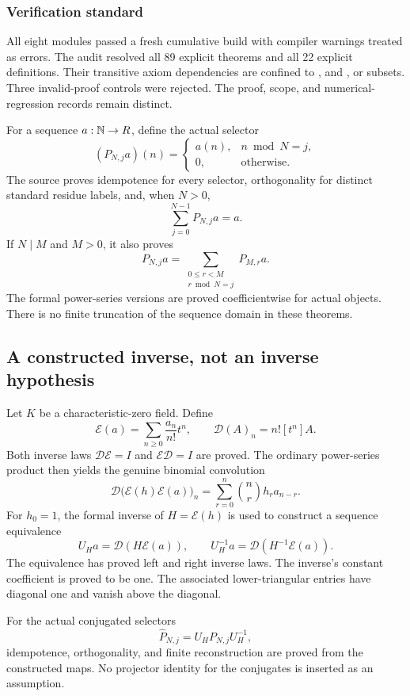 \subsubsection*{Verification standard}
All eight modules passed a fresh cumulative build with compiler warnings treated as errors. The audit resolved all 89 explicit theorems and all 22 explicit definitions. Their transitive axiom dependencies are confined to ,  and , or subsets. Three invalid-proof controls were rejected. The proof, scope, and numerical-regression records remain distinct.
\par\medskip
{}
For a sequence $a:\mathbb N\to R$, define the actual selector
\[
 (P_{N,j}a)(n)=\begin{cases}a(n),&n\bmod N=j,\\0,&\text{otherwise.}\end{cases}
\]
The source proves idempotence for every selector, orthogonality for distinct standard residue labels, and, when $N>0$,
\[
 \sum_{j=0}^{N-1}P_{N,j}a=a.
\]
If $N\mid M$ and $M>0$, it also proves
\[
 P_{N,j}a=\sum_{\substack{0\le r<M\\r\bmod N=j}}P_{M,r}a.
\]
The formal power-series versions are proved coefficientwise for actual  objects. There is no finite truncation of the sequence domain in these theorems.

\subsection*{A constructed inverse, not an inverse hypothesis}
Let $K$ be a characteristic-zero field. Define
\[
 \mathcal E(a)=\sum_{n\ge0}\frac{a_n}{n!}t^n,\qquad
 \mathcal D(A)_n=n![t^n]A.
\]
Both inverse laws $\mathcal D\mathcal E=I$ and $\mathcal E\mathcal D=I$ are proved. The ordinary power-series product then yields the genuine binomial convolution
\[
 \mathcal D\bigl(\mathcal E(h)\mathcal E(a)\bigr)_n
 =\sum_{r=0}^{n}\binom nr h_r a_{n-r}.
\]
For $h_0=1$, the formal inverse of $H=\mathcal E(h)$ is used to construct a sequence equivalence
\[
 U_H a=\mathcal D(H\mathcal E(a)),\qquad
 U_H^{-1}a=\mathcal D(H^{-1}\mathcal E(a)).
\]
The equivalence has proved left and right inverse laws. The inverse's constant coefficient is proved to be one. The associated lower-triangular entries have diagonal one and vanish above the diagonal.

For the actual conjugated selectors
\[
 \widehat P_{N,j}=U_HP_{N,j}U_H^{-1},
\]
idempotence, orthogonality, and finite reconstruction are proved from the constructed maps. No projector identity for the conjugates is inserted as an assumption.

